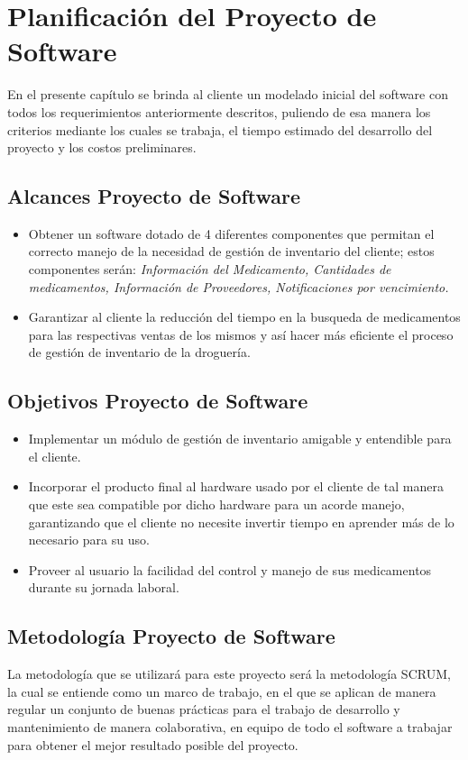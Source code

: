 \chapter{Planificaci\'on del Proyecto de Software}
En el presente cap\'itulo se brinda al cliente un modelado inicial del software con todos los requerimientos anteriormente descritos, puliendo de esa manera los criterios mediante los cuales se trabaja, el tiempo estimado del desarrollo del proyecto y los costos preliminares.

\section{Alcances Proyecto de Software}
\begin{itemize}
	\item Obtener un software dotado de 4 diferentes componentes que permitan el correcto manejo de la necesidad de gesti\'on de inventario del cliente; estos componentes ser\'an: \textit{Informaci\'on del Medicamento, Cantidades de medicamentos, Informaci\'on de Proveedores, Notificaciones por vencimiento.}
	\item Garantizar al cliente la reducci\'on del tiempo en la busqueda de medicamentos para las respectivas ventas de los mismos y as\'i hacer m\'as eficiente el proceso de gesti\'on de inventario de la droguer\'ia.
\end{itemize}
\newpage
\section{Objetivos Proyecto de Software}
\begin{itemize}
	\item Implementar un m\'odulo de gesti\'on de inventario amigable y entendible para el cliente.
	\item Incorporar el producto final al hardware usado por el cliente de tal manera que este sea compatible por dicho hardware para un acorde manejo, garantizando que el cliente no necesite invertir tiempo en aprender m\'as de lo necesario para su uso.
	\item Proveer al usuario la facilidad del control y manejo de sus medicamentos durante su jornada laboral.
\end{itemize}
\section{Metodolog\'ia Proyecto de Software}
La metodolog\'ia que se utilizar\'a para este proyecto ser\'a la metodolog\'ia SCRUM, la cual se entiende como un marco de trabajo, en el que se aplican de manera regular un conjunto de buenas pr\'acticas para el trabajo de desarrollo y mantenimiento de manera colaborativa, en equipo de todo el software a trabajar para obtener el mejor resultado posible del proyecto.\\

